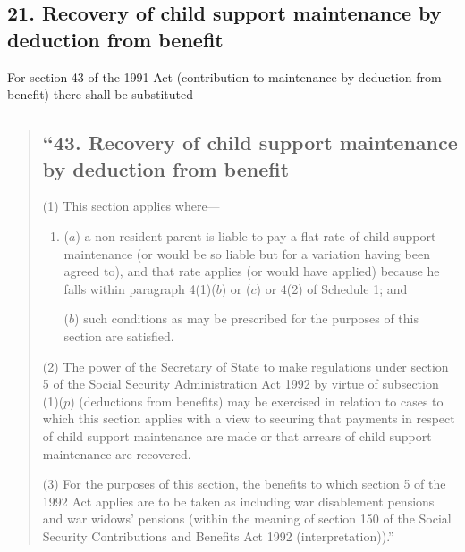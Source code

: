 \documentclass[12pt,a4paper]{article}
\begin{document}

\subsection{21. Recovery of child support maintenance by deduction from benefit}

For section 43 of the 1991 Act (contribution to maintenance by deduction from benefit) there shall be substituted—
\begin{quotation}
\subsection*{“43. Recovery of child support maintenance by deduction from benefit}

(1) This section applies where—
\begin{enumerate}\item[]
($a$) a non-resident parent is liable to pay a flat rate of child support maintenance (or would be so liable but for a variation having been agreed to), and that rate applies (or would have applied) because he falls within paragraph 4(1)($b$)  or ($c$)  or 4(2)  of Schedule 1; and

($b$) such conditions as may be prescribed for the purposes of this section are satisfied.
\end{enumerate}

(2) The power of the Secretary of State to make regulations under section 5 of the Social Security Administration Act 1992 by virtue of subsection (1)($p$)  (deductions from benefits) may be exercised in relation to cases to which this section applies with a view to securing that payments in respect of child support maintenance are made or that arrears of child support maintenance are recovered.

(3) For the purposes of this section, the benefits to which section 5 of the 1992 Act applies are to be taken as including war disablement pensions and war widows' pensions (within the meaning of section 150 of the Social Security Contributions and Benefits Act 1992 (interpretation)).”
\end{quotation}

\end{document}
